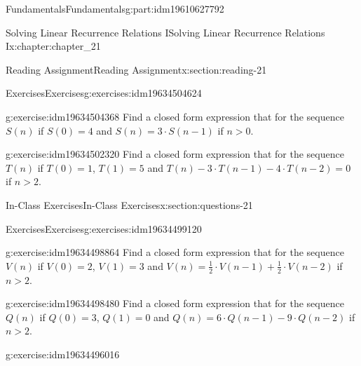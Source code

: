 \documentclass[oneside,10pt,]{book}
\numberwithin{equation}{section}
\newcommand{\gt}{>}
\begin{document}
\begin{partptx}{Fundamentals}{}{Fundamentals}{}{}{g:part:idm19610627792}
\begin{chapterptx}{Solving Linear Recurrence Relations I}{}{Solving Linear Recurrence Relations I}{}{}{x:chapter:chapter_21}
\begin{sectionptx}{Reading Assignment}{}{Reading Assignment}{}{}{x:section:reading-21}
\begin{exercises-subsection-numberless}{Exercises}{}{Exercises}{}{}{g:exercises:idm19634504624}
\par\medskip\noindent%
%
\begin{exercisegroup}
\begin{divisionexerciseeg}{1}{}{}{g:exercise:idm19634504368}%
Find a closed form expression that for the sequence \(S(n)\) if  \(S(0)=4\) and \(S(n)=3 \cdot S(n-1)\) if \(n \gt 0\).%
\end{divisionexerciseeg}%
\begin{divisionexerciseeg}{2}{}{}{g:exercise:idm19634502320}%
Find a closed form expression that for the sequence \(T(n)\) if  \(T(0)=1\), \(T(1)= 5\) and \(T(n)- 3\cdot T(n-1) -4 \cdot T(n-2)=0\) if \(n \gt 2\).%
\end{divisionexerciseeg}%
\end{exercisegroup}
\par\medskip\noindent
\end{exercises-subsection-numberless}
\end{sectionptx}
%
%
\typeout{************************************************}
\typeout{************************************************}
%
\begin{sectionptx}{In-Class Exercises}{}{In-Class Exercises}{}{}{x:section:questions-21}
%
%
%
\typeout{************************************************}
\typeout{************************************************}
%
\begin{exercises-subsection-numberless}{Exercises}{}{Exercises}{}{}{g:exercises:idm19634499120}
\par\medskip\noindent%
%
\begin{exercisegroup}
\begin{divisionexerciseeg}{1}{}{}{g:exercise:idm19634498864}%
Find a closed form expression that for the sequence \(V(n)\) if  \(V(0)=2\), \(V(1)= 3\) and \(V(n)= \frac{1}{2}\cdot V(n-1)+ \frac{1}{2}\cdot V(n-2)\) if \(n \gt 2\).%
\end{divisionexerciseeg}%
\begin{divisionexerciseeg}{2}{}{}{g:exercise:idm19634498480}%
Find a closed form expression that for the sequence \(Q(n)\) if  \(Q(0)=3\), \(Q(1)= 0\) and \(Q(n)=6\cdot Q(n-1)-9\cdot Q(n-2)\) if \(n \gt 2\).%
\end{divisionexerciseeg}%
\begin{divisionexerciseeg}{3}{}{}{g:exercise:idm19634496016}%

\end{divisionexerciseeg}
\end{exercisegroup}
\end{exercises-subsection-numberless}
\end{sectionptx}
\end{chapterptx}
\end{partptx}
\end{document}
